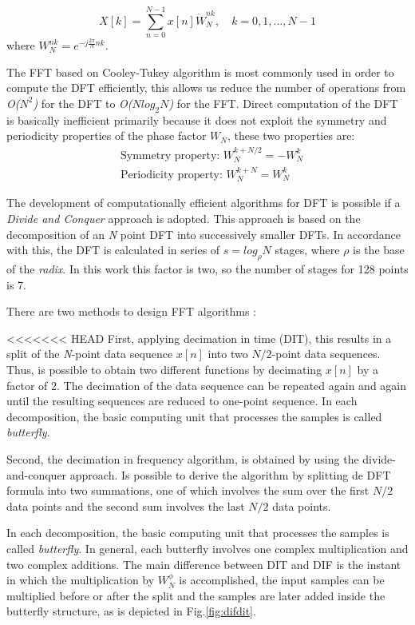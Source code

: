\documentclass[journal,comsoc]{IEEEtran}
\begin{document}
\begin{equation}
	X[k] = \sum_{n=0}^{N-1} x[n] \dot W_N^{nk}, \quad k=0,1,...,N-1
\end{equation}
where $W_N^{nk} = e^{-j\frac{2\pi}{N} nk}$. 

The FFT based on Cooley-Tukey algorithm is most commonly used in order to compute the DFT efficiently, this allows us reduce the number of operations from \textit{O($N^2$)} for the DFT to \textit{O($Nlog_2N$)} for the FFT. Direct computation of the DFT is basically inefficient primarily because it does not exploit the symmetry and periodicity properties of the phase factor $W_N$, these two properties are:
\begin{align}
	&\text{Symmetry property: } W_N^{k+N/2} = -W_N^k	\\
	&\text{Periodicity property: } W_N^{k+N} = W_N^k
\end{align}

The development of computationally efficient algorithms for DFT is possible if a \textit{Divide and Conquer} approach is adopted. This approach is based on the decomposition of an \textit{N} point DFT into successively smaller DFTs. In accordance with this, the DFT is calculated in series of $s=log_\rho N$ stages, where $\rho$ is the base of the \textit{radix}. In this work this factor is two, so the number of stages for 128 points is 7.

There are two methods to design FFT algorithms \cite{proakis_digital_nodate,oppenheim_tratamiento_2011}: 

<<<<<<< HEAD
First, applying decimation in time (DIT), this results in a split of the \textit{N}-point data sequence $x[n]$ into two $N/2$-point data sequences. Thus, is possible to obtain two different functions by decimating $x[n]$ by a factor of 2. The decimation of the data sequence can be repeated again and again until the resulting sequences are reduced to one-point sequence. In each decomposition, the basic computing unit that processes the samples is called \textit{butterfly}.

Second, the decimation in frequency algorithm, is obtained by using the divide-and-conquer approach. Is possible to derive the algorithm by splitting de DFT formula into two summations, one of which involves the sum over the first $N/2$ data points and the second sum involves the last $N/2$ data points.

In each decomposition, the basic computing unit that processes the samples is called \textit{butterfly}. In general, each butterfly involves one complex multiplication and two complex additions. The main difference between DIT and DIF is the instant in which the multiplication by $W_N^\phi$ is accomplished, the input samples can be multiplied before or after the split and the samples are later added inside the butterfly structure, as is depicted in Fig.\ref{fig:difdit}.
\end{document}
